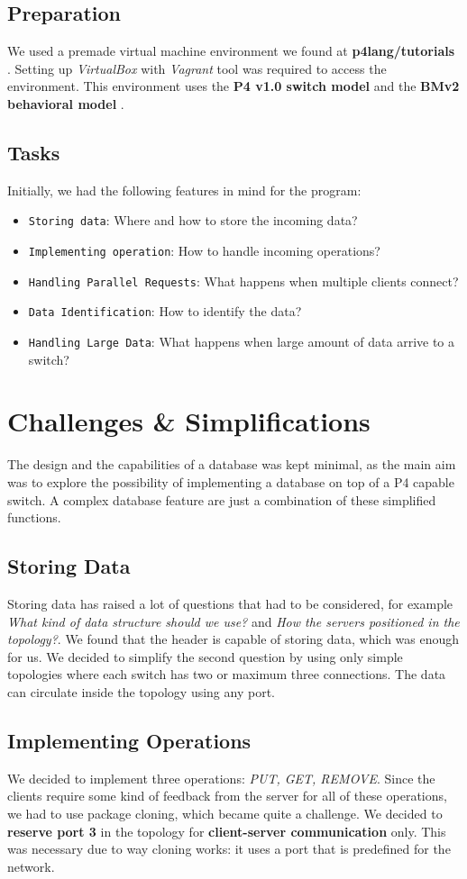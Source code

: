 \documentclass[sigconf,natbib=false]{acmart}
\begin{document}
\subsection{Preparation}
We used a premade virtual machine environment we found at \textbf{p4lang/tutorials} \cite{p4tut}. Setting up \textit{VirtualBox} with  \textit{Vagrant} tool was required to access the environment. This environment uses the \textbf{P4 v1.0 switch model} \cite{v1model} and the \textbf{BMv2 behavioral model} \cite{bmv2}.
\subsection{Tasks}
Initially, we had the following features in mind for the program:
\begin{itemize}
	\item {\verb|Storing data|}: Where and how to store the incoming data?
	\item{\verb|Implementing operation|}: How to handle incoming operations?
	\item{\verb|Handling Parallel Requests|}: What happens when multiple clients connect?
	\item{\verb|Data Identification|}: How to identify the data?
	\item{\verb|Handling Large Data|}: What happens when large amount of data arrive to a switch?
\end{itemize}

\section{Challenges \& Simplifications}
The design and the capabilities of a database was kept minimal, as the main aim was to explore the possibility of implementing a database on top of a P4 capable switch. A complex database feature are just a combination of these simplified functions.
\subsection{Storing Data}
Storing data has raised a lot of questions that had to be considered, for example \textit{What kind of data structure should we use?} and \textit{How the servers positioned in the topology?}. We found that the header is capable of storing data, which was enough for us. We decided to simplify the second question by using only simple topologies where each switch has two or maximum three connections. The data can circulate inside the topology using any port.
\subsection{Implementing Operations}
We decided to implement three operations: \textit{PUT, GET, REMOVE}. Since the clients require some kind of feedback from the server for all of these operations, we had to use package cloning, which became quite a challenge. We decided to \textbf{reserve port 3} in the topology for \textbf{client-server communication} only. This was necessary due to way cloning works: it uses a port that is predefined for the network.
\end{document}

